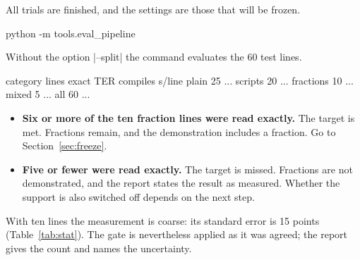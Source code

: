 \label{st:gaterun}
All trials are finished, and the settings are those that will be frozen.
\begin{ps}
python -m tools.eval_pipeline
\end{ps}
Without the option \code|--split| the command evaluates the 60 test lines.
\begin{out}
category   lines   exact     TER  compiles  s/line
plain         25     ...%
scripts       20     ...%
fractions     10     ...%
mixed          5     ...%
all           60     ...%
\end{out}

\label{st:gatedecide}
\begin{itemize}
\item \textbf{Six or more of the ten fraction lines were read exactly.} The target is met.
  Fractions remain, and the demonstration includes a fraction. Go to Section~\ref{sec:freeze}.
\item \textbf{Five or fewer were read exactly.} The target is missed. Fractions are not
  demonstrated, and the report states the result as measured. Whether the support is also
  switched off depends on the next step.
\end{itemize}
With ten lines the measurement is coarse: its standard error is 15 points
(Table~\ref{tab:stat}). The gate is nevertheless applied as it was agreed; the report gives the
count and names the uncertainty.

